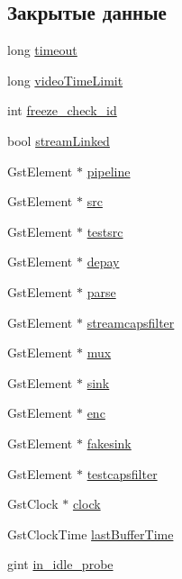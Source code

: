\subsection*{Закрытые данные}
\begin{DoxyCompactItemize}
\item 
long \hyperlink{class_recording_a395293a5505e242ace2abd0ea8269d7c}{timeout}
\item 
long \hyperlink{class_recording_a222cf4edc0c19920121639525e6975e3}{video\+Time\+Limit}
\item 
int \hyperlink{class_recording_aef145697847a9e6675766dff249cf345}{freeze\+\_\+check\+\_\+id}
\item 
bool \hyperlink{class_recording_a8b3e718465495256436ee9dec586db1b}{stream\+Linked}
\item 
Gst\+Element $\ast$ \hyperlink{class_recording_af8c6df8e128533d6302e1f3bbaeac24b}{pipeline}
\item 
Gst\+Element $\ast$ \hyperlink{class_recording_ac8a63197a7a9f24e6af9d204c351d9ab}{src}
\item 
Gst\+Element $\ast$ \hyperlink{class_recording_a8899df1df3191c30d75d1318f12a9bec}{testsrc}
\item 
Gst\+Element $\ast$ \hyperlink{class_recording_a52bbcffe004812e90c5153c9051ba42e}{depay}
\item 
Gst\+Element $\ast$ \hyperlink{class_recording_af9bcc96225df8f1bf8fa33605b275656}{parse}
\item 
Gst\+Element $\ast$ \hyperlink{class_recording_a8c794a5feb7aa0584742584bbaca44fe}{streamcapsfilter}
\item 
Gst\+Element $\ast$ \hyperlink{class_recording_aa27843b1afce4572ab5bf4a910290b59}{mux}
\item 
Gst\+Element $\ast$ \hyperlink{class_recording_a006ab2adce4204e46eea916f17b68401}{sink}
\item 
Gst\+Element $\ast$ \hyperlink{class_recording_ab6006415906dfd17903df1bd5e45445c}{enc}
\item 
Gst\+Element $\ast$ \hyperlink{class_recording_ac94a1a97b8e08c825dcfb7a75b20dfed}{fakesink}
\item 
Gst\+Element $\ast$ \hyperlink{class_recording_aa947984714cd94e8648c51fed143059c}{testcapsfilter}
\item 
Gst\+Clock $\ast$ \hyperlink{class_recording_a54a3555942d7e9980c1dd6af64de05e0}{clock}
\item 
Gst\+Clock\+Time \hyperlink{class_recording_a3dfeb68c3b09bd72f332f466b6512448}{last\+Buffer\+Time}
\item 
gint \hyperlink{class_recording_a62a737d846719fb3d13cbfec4f2b7387}{in\+\_\+idle\+\_\+probe}
\end{DoxyCompactItemize}


